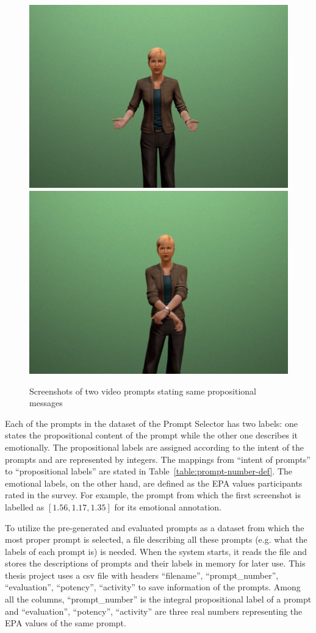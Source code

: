 %
\begin{figure}[htb]
\centering
\includegraphics[width=0.45\linewidth]{fig/prompt1.jpg}
\includegraphics[width=0.45\linewidth]{fig/prompt2.jpg}
\caption{Screenshots of two video prompts stating same propositional messages}
\label{fig:sample-prompt}
\end{figure}

Each of the prompts in the dataset of the Prompt Selector has two labels: one states the propositional content of the prompt while the other one describes it emotionally. The propositional labels are assigned according to the intent of the prompts and are represented by integers. The mappings from ``intent of prompts'' to ``propositional labels'' are stated in Table~\ref{table:prompt-number-def}. The emotional labels, on the other hand, are defined as the EPA values participants rated in the survey. For example, the prompt from which the first screenshot is labelled as $[1.56, 1.17, 1.35]$ for its emotional annotation.

To utilize the pre-generated and evaluated prompts as a dataset from which the most proper prompt is selected, a file describing all these prompts (e.g. what the labels of each prompt is) is needed. When the system starts, it reads the file and stores the descriptions of prompts and their labels in memory for later use. This thesis project uses a csv file with headers ``filename'', ``prompt\_number'', ``evaluation'', ``potency'', ``activity'' to save information of the prompts. Among all the columns, ``prompt\_number'' is the integral propositional label of a prompt and ``evaluation'', ``potency'', ``activity'' are three real numbers representing the EPA values of the same prompt. 

